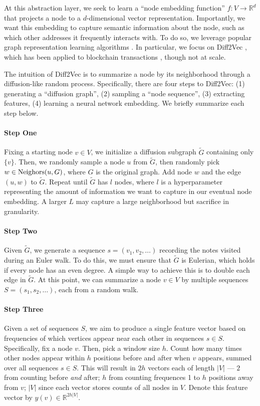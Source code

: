 \documentclass[11pt,a4paper]{article}
\begin{document}
At this abstraction layer, we seek to learn a ``node embedding function'' $f: V \rightarrow \mathbb{R}^d$ that projects a node to a $d$-dimensional vector representation. Importantly, we want this embedding to capture semantic information about the node, such as which other addresses it frequently interacts with. To do so, we leverage popular graph representation learning algorithms \citep{grover2016node2vec,rozemberczki2018fast}. In particular, we focus on Diff2Vec \citep{rozemberczki2018fast}, which has been applied to blockchain transactions \citep{beres2021blockchain}, though not at scale.

The intuition of Diff2Vec is to summarize a node by its neighborhood through a diffusion-like random process. Specifically, there are four steps to Diff2Vec: (1) generating a ``diffusion graph'', (2) sampling a ``node sequence'', (3) extracting features, (4) learning a neural network embedding. We briefly summarize each step below.

\paragraph{Step One} Fixing a starting node $v \in V$, we initialize a diffusion subgraph $\tilde{G}$ containing only $\{v\}$. Then, we randomly sample a node $u$ from $\tilde{G}$, then randomly pick $w \in \textup{Neighors}(u, G)$, where $G$ is the original graph. Add node $w$ and the edge $(u, w)$ to $\tilde{G}$. Repeat until $\tilde{G}$ has $l$ nodes, where $l$ is a hyperparameter representing the amount of information we want to capture in our eventual node embedding. A larger $L$ may capture a large neighborhood but sacrifice in granularity.

\paragraph{Step Two} Given $\tilde{G}$, we generate a sequence $s = (v_1, v_2, \ldots)$ recording the notes visited during an Euler walk. To do this, we must ensure that $\tilde{G}$ is Eulerian, which holds if every node has an even degree. A simple way to achieve this is to double each edge in $\tilde{G}$. At this point, we can summarize a node $v \in V$ by multiple sequences $S = (s_1, s_2, \ldots)$, each from a random walk.

\paragraph{Step Three} Given a set of sequences $S$, we aim to produce a single feature vector based on frequencies of which vertices appear near each other in sequences $s \in S$. Specifically, fix a node $v$. Then, pick a window size $h$.
Count how many times other nodes appear within $h$ positions before and after when $v$ appears, summed over all sequences $s \in S$. This will result in $2h$ vectors each of length $|V|$ --- $2$ from counting before \textit{and} after; $h$ from counting frequences 1 to $h$ positions away from $v$; $|V|$ since each vector stores counts of all nodes in $V$. Denote this feature vector by $y(v) \in \mathbb{R}^{2h|V|}$.
\end{document}
